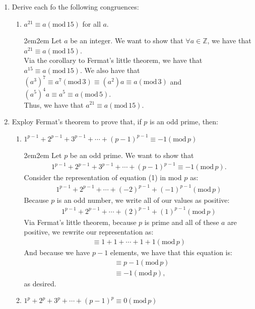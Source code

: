 \documentclass[10pt,oneside]{book}
\newcommand{\Z}{\mathbb{Z}}\newcommand{\R}{\mathbb{R}}\newcommand{\N}{\mathbb{N}}
\newcommand{\gspc}{\vspace{0.13cm}} %
\newcommand{\gline}{\gspc\\} %
\newcommand{\gmod}{\text{mod}\,}
\let\endoldproof\endproof
\renewenvironment{proof}[1][\proofname]
  {\vspace{0.2cm}\begin{adjustwidth}{2em}{2em}
   \oldproof[#1]}
  {\endoldproof
\end{adjustwidth}}
\begin{document}
\begin{enumerate}
\begin{enumerate}
	\end{enumerate}
	\item Derive each fo the following congruences:
	\begin{enumerate}
		\item $a^{21}\equiv a(\gmod 15)$ for all $a$. 
		\begin{proof}
			Let $a$ be an integer. We want to show that $\forall a\in \Z$, we have that $a^{21}\equiv a(\gmod 15)$.\gline
			Via the corollary to Fermat's little theorem, we have that $a^{15}\equiv a (\gmod 15)$. We also have that $(a^3)^7\equiv a^7 (\gmod 3)\equiv (a^2)a \equiv a (\gmod 3)$ and $(a^5)^4a  \equiv a^5 \equiv a (\gmod 5)$.\gline
			Thus, we have that $a^{21} \equiv a (\gmod 15)$. 
		\end{proof}
	\end{enumerate}
	\item Exploy Fermat's theorem to prove that, if $p$ is an odd prime, then:
	\begin{enumerate}
		\item $1^{p-1}+2^{p-1}+3^{p-1}+\cdots+(p-1)^{p-1}\equiv-1(\gmod p)$
		\begin{proof}
			Let $p$ be an odd prime. We want to show that 
			\begin{align}
				1^{p-1}+2^{p-1}+3^{p-1}+\cdots+(p-1)^{p-1}\equiv-1(\gmod p).
			\end{align}
			Consider the representation of equation (1) in mod $p$ as:
			\begin{align*}
				1^{p-1}+2^{p-1}+\cdots + (-2)^{p-1} + (-1)^{p-1}(\gmod p)
			\end{align*}
			Because $p$ is an odd number, we write all of our values as positive:
			\begin{align*}
				1^{p-1}+2^{p-1}+\cdots + (2)^{p-1} + (1)^{p-1}(\gmod p)
			\end{align*}
			Via Fermat's little theorem, because $p$ is prime and all of these $a$ are positive, we rewrite our representation as:
			\begin{align*}
				\equiv 1+1+\cdots + 1 + 1(\gmod p)
			\end{align*}
			And because we have $p-1$ elements, we have that this equation is:
			\begin{align*}
				&\equiv p -1 (\gmod p)\\
				&\equiv -1 (\gmod p),
			\end{align*}
			as desired.
		\end{proof}
		\item $1^p + 2^p + 3^p + \cdots + (p-1)^p \equiv 0 (\gmod p)$

\end{enumerate}
\end{enumerate}
\end{document}
